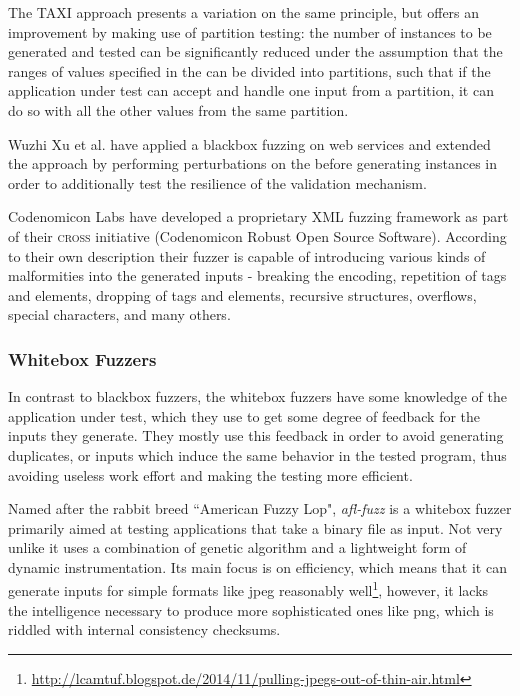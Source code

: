 The TAXI\cite{Bertolino:2007:ATD:1270230.1270257} approach presents a variation on the same principle, but
offers an improvement by making use of partition testing: the number of instances to be generated
and tested can be significantly reduced under the assumption that the ranges of values specified in the \xsd
can be divided into partitions, such that if the application under test can accept and handle one input from a
partition, it can do so with all the other values from the same partition.

Wuzhi Xu et al.\cite{1544740} have applied a blackbox fuzzing on web services and extended the approach by
performing perturbations on the \xsd before generating instances in order to additionally test the resilience
of the validation mechanism.

Codenomicon Labs have developed a proprietary XML fuzzing framework\cite{codenomicon} as part of their
\textsc{cross} initiative (Codenomicon Robust Open Source Software). According to their own description their
fuzzer is capable of introducing various kinds of malformities into the generated inputs - breaking the
encoding, repetition of tags and elements, dropping of tags and elements, recursive structures, overflows,
special characters, and many others.

\tocless\subsubsection{Whitebox Fuzzers}
In contrast to blackbox fuzzers, the whitebox fuzzers have some knowledge of the application under
test, which they use to get some degree of feedback for the inputs they generate. They mostly use this feedback
in order to avoid generating duplicates, or inputs which induce the same behavior in the tested program, thus
avoiding useless work effort and making the testing more efficient.

Named after the rabbit breed ``American Fuzzy Lop", \emph{afl-fuzz}\cite{afl} is a whitebox fuzzer
primarily aimed at testing applications that take a binary file as input. Not very unlike \xmlmate it uses a
combination of genetic algorithm and a lightweight form of dynamic instrumentation. Its main focus is on
efficiency, which means that it can generate inputs for simple formats like jpeg reasonably
well\footnote{\url{http://lcamtuf.blogspot.de/2014/11/pulling-jpegs-out-of-thin-air.html}}, however, it lacks
the intelligence necessary to produce more sophisticated ones like png, which is riddled with internal
consistency checksums.

